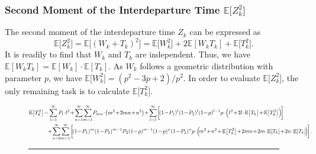 \documentclass{IEEEtran}
\begin{document}
\subsubsection{Second Moment of the Interdeparture Time $\mathbb{E}\big[Z_{k}^{2}\big]$}The second moment of the interdeparture time $Z_k$ can be expressed as 
\begin{equation}\label{Z^2sp}
\mathbb{E}\big[Z_k^2\big]\!\!=\!\mathbb{E}\big[(W_{k}+T_{k})^2\big]\!\!=\!\mathbb{E}\big[W_{k}^{2}\big]+2\mathbb{E}[W_{k} T_{k}]+\mathbb{E}\big[T_{k}^{2}\big].
\end{equation}
It is readily to find that $W_{k}$ and $T_{k}$ are independent. Thus, we have $\mathbb{E}[W_{k}T_{k}]=\mathbb{E}[W_{k}]\cdot \mathbb{E}[T_{k}]$. As $W_{k}$ follows a geometric distribution with parameter $p$, we have $\mathbb{E}\big[W_{k}^2\big]=(p^2-3p+2)/p^2$. In order to evaluate $\mathbb{E}\big[Z_{k}^2\big]$, the only remaining task is to calculate $\mathbb{E}\big[T_{k}^2\big]$.

\begin{figure*}
	\begin{equation}\label{T^2sp1}
	\resizebox{.99\hsize}{!}{$\begin{aligned}
		\mathbb{E}\big[T_{k}^{2}\big]\!=\!\!&\
		\sum_{l=1}^{\infty}P_{l}\!\cdot\! l^2 \!+\! \sum_{n=1}^{\infty}\!\sum_{m=1}^{\infty}\!P_{mn}\!\cdot\! \big(m^2\!+\!2mn\!+\!n^2\big)
		\!+\!\sum_{l=1}^{\infty}\!\bigg[\!(1\!-\!P_{1})^{l}(1\!-\!P_{2})^{l}(1\!-\!p)^{l-1}p
		\!\cdot\!\Big(l^2\!+\!2l\!\cdot\!\mathbb{E}\big[T_{k}\big]\!+\!\mathbb{E}\big[T_{k}^{2}\big]\Big)\!\bigg]\\
		&\,\!+\! \sum_{n=0}^{\infty}\!\sum_{m=1}^{\infty}\!\bigg[\!(1\!-\!P_{1})^{m}(1\!-\!P_{2})^{m-1}P_{2}(1\!-\!p)^{m-1}
		(1\!-\!p)^{n}(1\!-\!P_{3})^{n}p
		\!\cdot\! \Big(\!m^2\!+\!n^2\!+\!\mathbb{E}\big[T_{k}^{2}\big]\!
		+\!2mn\!+\!2m\!\cdot\!\mathbb{E}[T_{k}]\!+\!2n\!\cdot\!\mathbb{E}[T_{k}]\!\Big)\!\bigg].
		\end{aligned}$}
	\vspace{-0.05cm}
	\end{equation}
	\vspace{-0.45cm}	
	\noindent\rule[0\baselineskip]{\textwidth}{0.4pt}
\end{figure*}
\end{document}
